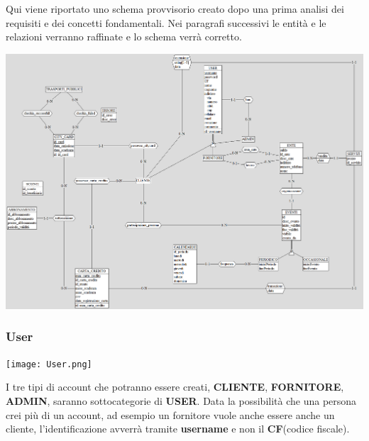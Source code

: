 Qui viene riportato uno schema provvisorio creato dopo una prima analisi dei requisiti e dei concetti fondamentali. 
Nei paragrafi successivi le entità e le relazioni verranno raffinate e lo schema verrà corretto.\\

\begin{center}
\centerline{\includegraphics[width=0.9\paperwidth]{images/schema_ER_iniziale.png}}
\end{center}

\subsubsection{User}
\begin{center}
\texttt{[image: User.png]}
\end{center}
I tre tipi di account che potranno essere creati, \textbf{CLIENTE}, \textbf{FORNITORE}, \textbf{ADMIN},  saranno sottocategorie di \textbf{USER}. Data la possibilità che una persona crei più di un account, ad esempio un fornitore vuole anche essere anche un cliente, l'identificazione avverrà tramite \textbf{username} e non il \textbf{CF}(codice fiscale).


